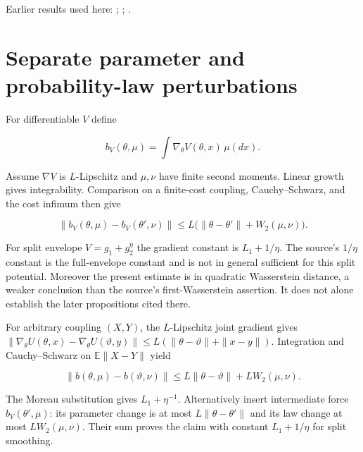 \documentclass[11pt,a4paper]{article}
\begin{document}
Earlier results used here: \cite[Section~3.1.1]{LangevinLean2026IPLA}; \cite[Section~3.3.1]{LangevinLean2026IPLA}; \cite[Section~3.9.1]{LangevinLean2026IPLA}.

\section{\texorpdfstring{Separate parameter and probability-law perturbations}{Separate parameter and probability-law perturbations}}


For differentiable \(V\) define

\[
b_V(\theta,\mu)=\int \nabla_\theta V(\theta,x)\,\mu(dx).
\]

Assume \(\nabla V\) is \(L\)-Lipschitz and \(\mu,\nu\) have finite second moments. Linear growth gives integrability. Comparison on a finite-cost coupling, Cauchy–Schwarz, and the cost infimum then give

\[
\|b_V(\theta,\mu)-b_V(\theta',\nu)\|
 \le L\bigl(\|\theta-\theta'\|+W_2(\mu,\nu)\bigr).
\]

For split envelope \(V=g_1+g_2^\eta\) the gradient constant is \(L_1+1/\eta\). The source’s \(1/\eta\) constant is the full-envelope constant and is not in general sufficient for this split potential. Moreover the present estimate is in quadratic Wasserstein distance, a weaker conclusion than the source’s first-Wasserstein assertion. It does not alone establish the later propositions cited there.



For arbitrary coupling \((X,Y)\), the \(L\)-Lipschitz joint gradient gives \(\|\nabla_\theta U(\theta,x)-\nabla_\theta U(\vartheta,y)\|\le L(\|\theta-\vartheta\|+\|x-y\|)\). Integration and Cauchy–Schwarz on \(\mathbb E\|X-Y\|\) yield

\[\|b(\theta,\mu)-b(\vartheta,\nu)\|\le L\|\theta-\vartheta\|+LW_2(\mu,\nu).\]

The Moreau substitution gives \(L_1+\eta^{-1}\). Alternatively insert intermediate force \(b_V(\theta',\mu)\): its parameter change is at most \(L\|\theta-\theta'\|\) and its law change at most \(LW_2(\mu,\nu)\). Their sum proves the claim with constant \(L_1+1/\eta\) for split smoothing.
\end{document}
